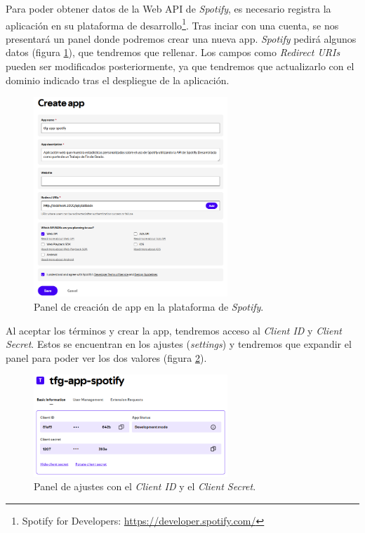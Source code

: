 Para poder obtener datos de la Web API de \textit{Spotify}, es necesario registra la aplicación en su plataforma de desarrollo\footnote{Spotify for Developers: \href{https://developer.spotify.com/}{https://developer.spotify.com/}}. Tras inciar con una cuenta, se nos presentará un panel donde podremos crear una nueva app. \textit{Spotify} pedirá algunos datos (figura \ref{fig:create_app}), que tendremos que rellenar. Los campos como \textit{Redirect URIs} pueden ser modificados posteriormente, ya que tendremos que actualizarlo con el dominio indicado tras el despliegue de la aplicación.

\begin{figure}[H]
    \centering
    \includegraphics[width=0.65\textwidth]{figures/registro_spotify/create_app.png}
    \caption{Panel de creación de app en la plataforma de \textit{Spotify}.}
    \label{fig:create_app}
\end{figure}

Al aceptar los términos y crear la app, tendremos acceso al \textit{Client ID} y \textit{Client Secret}. Estos se encuentran en los ajustes (\textit{settings}) y tendremos que expandir el panel para poder ver los dos valores (figura \ref{fig:client_id_secret}).

\begin{figure}[H]
    \centering
    \includegraphics[width=0.65\textwidth]{figures/registro_spotify/client_id_secret.png}
    \caption{Panel de ajustes con el \textit{Client ID} y el \textit{Client Secret}.}
    \label{fig:client_id_secret}
\end{figure}

